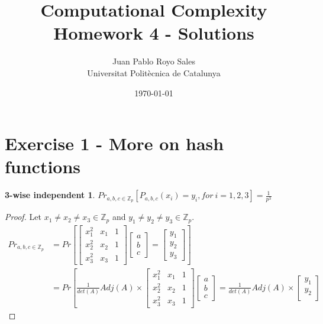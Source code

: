 \documentclass[12pt, a4paper]{article}
\title{%
  Computational Complexity \\
  Homework 4 - Solutions
}
\author{%
  Juan Pablo Royo Sales\\
  \small{Universitat Politècnica de Catalunya}
}
\date\today
\begin{document}
\maketitle

\section{Exercise 1 - More on hash functions}
\newtheorem{3wise}{3-wise independent}
\begin{3wise}
  $Pr_{a,b,c \in \mathbb{Z}_p} \left[ P_{a,b,c}(x_i) = y_i, for\ i = 1,2,3 \right] = \frac{1}{p^3}$
\end{3wise}

\begin{proof}
  Let $x_1 \neq x_2 \neq x_3 \in \mathbb{Z}_p$ and $y_1 \neq y_2 \neq y_3 \in \mathbb{Z}_p$.
  \begin{subequations}
    \begin{align}
      Pr_{a,b,c \in \mathbb{Z}_p} &= Pr \left[ \begin{bmatrix}
        x_{1}^2 & x_1 & 1\\
        x_{2}^2 & x_2 & 1\\
        x_{3}^2 & x_3 & 1
        \end{bmatrix}
        \begin{bmatrix}
        a\\
        b\\
        c
        \end{bmatrix}
        =
        \begin{bmatrix}
        y_1\\
        y_2\\
        y_3
        \end{bmatrix}
      \right] \\
      &= Pr \left[ \frac{1}{det(A)}Adj(A) \times \begin{bmatrix}
        x_{1}^2 & x_1 & 1\\
        x_{2}^2 & x_2 & 1\\
        x_{3}^2 & x_3 & 1
        \end{bmatrix}
        \begin{bmatrix}
        a\\
        b\\
        c
        \end{bmatrix}
        = \frac{1}{det(A)}Adj(A) \times
        \begin{bmatrix}
        y_1\\
        y_2\\

\end{bmatrix}
\end{align}
\end{subequations}
\end{proof}
\end{document}
